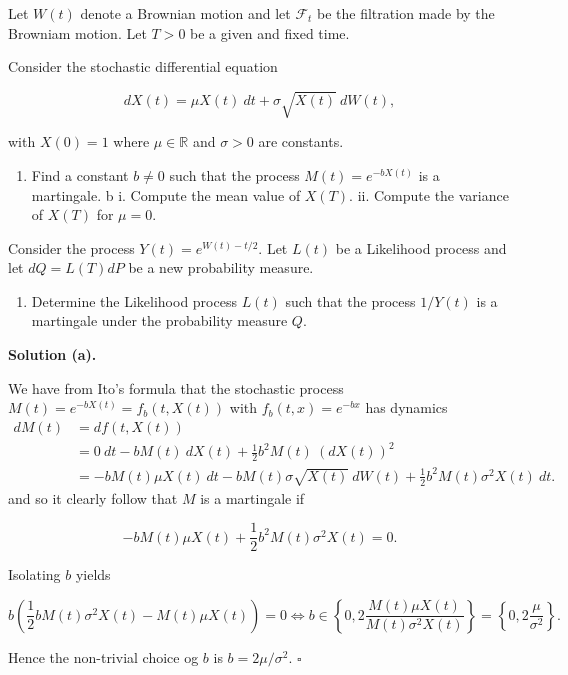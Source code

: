 \documentclass[a4paper,12pt,openany]{book}
\providecommand{\tightlist}{%
 \setlength{\itemsep}{0pt}\setlength{\parskip}{0pt}}
\begin{document}
Let \(W(t)\) denote a Brownian motion and let \(\mathcal{F}_t\) be the filtration made by the Browniam motion. Let \(T>0\) be a given and fixed time.

Consider the stochastic differential equation

\[
dX(t)=\mu X(t)\ dt+\sigma\sqrt{X(t)}\ dW(t),
\]

with \(X(0)=1\) where \(\mu\in \mathbb{R}\) and \(\sigma >0\) are constants.

\begin{enumerate}
\def\labelenumi{\alph{enumi}.}
\tightlist
\item
  Find a constant \(b\ne 0\) such that the process \(M(t)=e^{-bX(t)}\) is a martingale.
  b
  i. Compute the mean value of \(X(T)\).
  ii. Compute the variance of \(X(T)\) for \(\mu=0\).
\end{enumerate}

Consider the process \(Y(t)=e^{W(t)-t/2}\). Let \(L(t)\) be a Likelihood process and let \(dQ=L(T)dP\) be a new probability measure.

\begin{enumerate}
\def\labelenumi{\alph{enumi}.}
\setcounter{enumi}{2}
\tightlist
\item
  Determine the Likelihood process \(L(t)\) such that the process \(1/Y(t)\) is a martingale under the probability measure \(Q\).
\end{enumerate}

\noindent\makebox[\linewidth]{\rule{\textwidth}{0.4pt}}

\textbf{Solution (a).}

We have from Ito's formula that the stochastic process \(M(t)=e^{-bX(t)}=f_b(t,X(t))\) with \(f_b(t,x)=e^{-bx}\) has dynamics
\begin{align*}
dM(t)&=df(t,X(t))\\
&=0\ dt-bM(t)\ dX(t)+\frac{1}{2}b^2M(t)\ (dX(t))^2\\
&=-bM(t)\mu X(t)\ dt-bM(t)\sigma \sqrt{X(t)}\ dW(t)+\frac{1}{2}b^2M(t)\sigma^2 X(t)\ dt.
\end{align*}
and so it clearly follow that \(M\) is a martingale if

\[
-bM(t)\mu X(t)+\frac{1}{2}b^2M(t)\sigma^2 X(t)=0.
\]

Isolating \(b\) yields

\[
b\left(\frac{1}{2}b M(t)\sigma^2 X(t)-M(t)\mu X(t)\right)=0\iff b\in\left\{0,2\frac{M(t)\mu X(t)}{M(t)\sigma^2 X(t)}\right\}=\left\{0,2\frac{\mu }{\sigma^2 }\right\}.
\]

Hence the non-trivial choice og \(b\) is \(b=2\mu/\sigma^2\). \(\square\)
\end{document}
